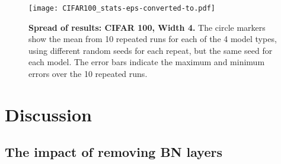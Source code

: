 \documentclass[conference]{IEEEtran}
\begin{document}
\begin{figure}[h]
\begin{center}
{\texttt{[image: CIFAR100\_stats-eps-converted-to.pdf]}}
\end{center}
\caption{{\bf  Spread of results: CIFAR 100, Width 4.} The circle markers show the mean from 10 repeated runs for each of the 4 model types, using different random seeds for each repeat, but the same seed for each model. The error bars indicate the maximum and minimum errors over the 10 repeated runs.}\label{fig:res2}
\end{figure}











\section{Discussion}\label{S5}

\subsection{The impact of removing BN layers}
\end{document}
